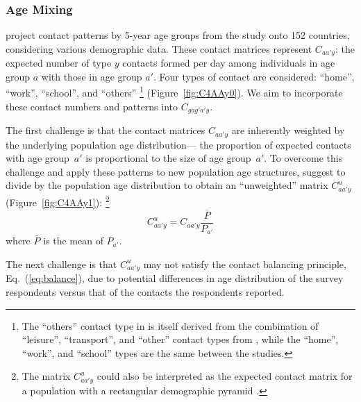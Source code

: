 \subsubsection{Age Mixing}\label{meth.prop.mix.age}
\citet{Prem2017} project contact patterns by 5-year age groups
from the \polymod study \cite{Mossong2008} onto 152 countries,
considering various demographic data.
These contact matrices represent $C_{aa'y}$:
the expected number of type $y$ contacts formed per day among
individuals in age group $a$ with those in age group $a'$.
Four types of contact are considered: ``home'', ``work'', ``school'', and ``others''%
\footnote{The ``others'' contact type in \cite{Prem2017} is itself derived from
  the combination of ``leisure'', ``transport'', and ``other'' contact types from \cite{Mossong2008},
  while the ``home'', ``work'', and ``school'' types are the same between the studies.}
(Figure~\ref{fig:C4AAy0}).
We aim to incorporate these contact numbers and patterns into $C_{gag'a'y}$.
\par
The first challenge is that the contact matrices $C_{aa'y}$ are
inherently weighted by the underlying population age distribution---%
the proportion of expected contacts with age group~$a'$ is proportional to the size of age group~$a'$.
To overcome this challenge and apply these patterns to new population age structures,
\citet{Arregui2018} suggest to divide by the population age distribution
to obtain an ``unweighted'' matrix $C^u_{aa'y}$ (Figure~\ref{fig:C4AAy1}):%
\footnote{The matrix $C^u_{aa'y}$ could also be interpreted as
  the expected contact matrix for a population with a rectangular demographic pyramid \cite{Arregui2018}.}
\begin{equation}\label{eq:C^u}
  C^u_{aa'y} = C_{aa'y} \frac{\bar{P}}{P_{a'}}
\end{equation}
where $\bar{P}$ is the mean of $P_{a'}$.
\par
The next challenge is that $C^u_{aa'y}$ may not satisfy
the contact balancing principle, Eq.~(\ref{eq:balance}),
due to potential differences in age distribution of
the \polymod survey respondents versus that of the contacts the respondents reported.
